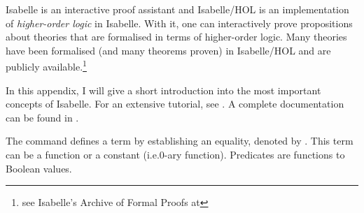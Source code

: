 %
\begin{isabellebody}%
%
%
\isadelimtheory
%
\endisadelimtheory
%
\isatagtheory
%
\endisatagtheory
{\isafoldtheory}%
%
\isadelimtheory
%
\endisadelimtheory
%
\isadelimdocument
%
\endisadelimdocument
%
\isatagdocument
%
\isamarkuptrue%
%
\endisatagdocument
{\isafolddocument}%
%
\isadelimdocument
%
\endisadelimdocument
%
\begin{isamarkuptext}%
\label{chap:isabelle}%
\end{isamarkuptext}\isamarkuptrue%
%
\begin{isamarkuptext}%
Isabelle is an interactive proof assistant and Isabelle/HOL is an implementation of \emph{higher-order logic} in Isabelle. With it, one can interactively prove propositions about theories that are formalised in terms of higher-order logic. Many theories have been formalised (and many theorems proven) in Isabelle/HOL and are publicly available.\footnote{see Isabelle's Archive of Formal Proofs at }

In this appendix, I will give a short introduction into the most important concepts of Isabelle. For an extensive tutorial, see \cite{prog_prove}. A complete documentation can be found in \cite{isar_ref}.
\vspace{-.3cm}%
\end{isamarkuptext}\isamarkuptrue%
%
\isadelimdocument
%
\endisadelimdocument
%
\isatagdocument
%
\isamarkuptrue%
%
\endisatagdocument
{\isafolddocument}%
%
\isadelimdocument
%
\endisadelimdocument
%
\begin{isamarkuptext}%
The command  defines a term by establishing an equality, denoted by \isa{{\isasymequiv}}. This term can be a function or a constant (i.e.\@ 0-ary function). Predicates are functions to Boolean values.


\end{isamarkuptext}
\end{isabellebody}
